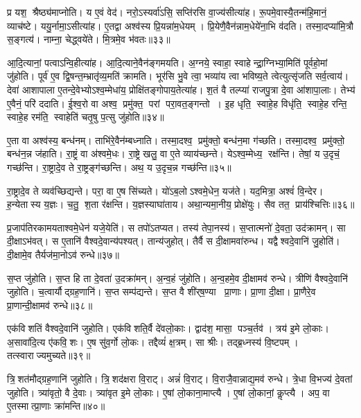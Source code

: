 प्र यश॒ श्रैष्ठ्य॑माप्नोति।
य ए॒वं वेद॑।
नरो॒ऽस्यर्वा॑ऽसि॒ सप्ति॑रसि वा॒ज्य॑सीत्या॑ह।
रू॒पमे॒वास्यै॒तन्म॑हि॒मानं॒ व्याच॑ष्टे।
ययु॒र्नामा॒ऽसीत्या॑ह।
ए॒तद्वा अश्व॑स्य प्रि॒यन्ना॑म॒धेयम्।
प्रि॒येणै॒वैन॑न्नाम॒धेये॑ना॒भि व॑दति।
तस्मा॒दप्या॑मि॒त्रौ स॒ङ्गत्य॑।
नाम्ना॒ चेद्ध्वये॑ते।
मि॒त्रमे॒व भ॑वतः॥३३॥

आ॒दि॒त्यानां॒ पत्वाऽन्वि॒हीत्या॑ह।
आ॒दि॒त्याने॒वैन॑ङ्गमयति।
अ॒ग्नये॒ स्वाहा॒ स्वाहेन्द्रा॒ग्निभ्या॒मिति॑ पूर्वहो॒मां जु॑होति।
पूर्व॑ ए॒व द्वि॒षन्त॒म्भ्रातृ॑व्य॒मति॑ क्रामति।
भूर॑सि भु॒वे त्वा॒ भव्या॑य त्वा भविष्य॒ते त्वेत्युत्सृ॑जति सर्व॒त्वाय॑।
देवा॑ आशापाला ए॒तन्दे॒वेभ्योऽश्व॒म्मेधा॑य॒ प्रोक्षि॑तङ्गोपाय॒तेत्या॑ह।
श॒तं वै तल्प्या॑ राजपु॒त्रा दे॒वा आ॑शापा॒लाः।
तेभ्य॑ ए॒वैनं॒ परि॑ ददाति।
ई॒श्व॒रो वा अश्व॒ प्रमु॑क्त॒ परां परा॒वत॒ङ्गन्तो।
इ॒ह धृति॒ स्वाहे॒ह विधृ॑ति॒ स्वाहे॒ह रन्ति॒ स्वाहे॒ह रम॑ति॒ स्वाहेति॑ चतृ॒षु प॒त्सु जु॑होति॥३४॥

ए॒ता वा अश्व॑स्य॒ बन्ध॑नम्।
ताभि॑रे॒वैन॑म्बध्नाति।
तस्मा॒दश्व॒ प्रमु॑क्तो॒ बन्ध॑न॒मा ग॑च्छति।
तस्मा॒दश्व॒ प्रमु॑क्तो॒ बन्ध॑न॒न्न ज॑हाति।
रा॒ष्ट्रं वा अ॑श्वमे॒धः।
रा॒ष्ट्रे खलु॒ वा ए॒ते व्याय॑च्छन्ते।
येऽश्व॒म्मेध्य॒ रक्ष॑न्ति।
तेषां॒ य उ॒दृचं॒ गच्छ॑न्ति।
रा॒ष्ट्रादे॒व ते रा॒ष्ट्रङ्ग॑च्छन्ति।
अथ॒ य उ॒दृच॒न्न गच्छ॑न्ति॥३५॥

रा॒ष्ट्रादे॒व ते व्यव॑च्छिद्यन्ते।
परा॒ वा ए॒ष सि॑च्यते।
यो॑ऽब॒लोऽश्वमे॒धेन॒ यज॑ते।
यद॒मित्रा॒ अश्वं॑ वि॒न्देर\sn{}।
ह॒न्येतास्य य॒ज्ञः।
च॒तु॒ श॒ता र॑क्षन्ति।
य॒ज्ञस्याघा॑ताय।
अथा॒न्यमा॒नीय॒ प्रोक्षे॑युः।
सैव तत॒ प्राय॑श्चित्तिः॥३६॥\anuvakamend[ग॒च्छ॒ति॒ भ॒व॒त॒ प॒त्सु जु॑होति॒ न गच्छ॑न्ति॒ नव॑ च]

प्र॒जाप॑तिरकामयताश्वमे॒धेन॑ यजे॒येति॑।
स तपो॑ऽतप्यत।
तस्य॑ तेपा॒नस्य॑।
स॒प्तात्मनो॑ दे॒वता॒ उद॑क्रामन्।
सा दी॒क्षाऽभ॑वत्।
स ए॒तानि॑ वैश्वदे॒वान्य॑पश्यत्।
तान्य॑जुहोत्।
तैर्वै स दी॒क्षामवा॑रुन्ध।
यद्वैश्वदे॒वानि॑ जु॒होति॑।
दी॒क्षामे॒व तैर्यज॑मा॒नोऽव॑ रुन्धे॥३७॥

स॒प्त जु॑होति।
स॒प्त हि ता दे॒वता॑ उ॒दक्रा॑मन्।
अ॒न्व॒हं जु॑होति।
अ॒न्व॒हमे॒व दी॒क्षामव॑ रुन्धे।
त्रीणि॑ वैश्वदे॒वानि॑ जुहोति।
च॒त्वार्यौद्ग्रह॒णानि॑।
स॒प्त सम्प॑द्यन्ते।
स॒प्त वै शी॑र्‌ष॒ण्या प्रा॒णाः।
प्रा॒णा दी॒क्षा।
प्रा॒णैरे॒व प्रा॒णान्दी॒क्षामव॑ रुन्धे॥३८॥

एक॑विशतिं वैश्वदे॒वानि॑ जुहोति।
एक॑विशति॒र्वै दे॑वलो॒काः।
द्वाद॑श॒ मासा॒ पञ्च॒र्तव॑।
त्रय॑ इ॒मे लो॒काः।
अ॒सावा॑दि॒त्य ए॑कवि॒शः।
ए॒ष सु॑व॒र्गो लो॒कः।
तद्दैव्यं॑ क्ष॒त्रम्।
सा श्रीः।
तद्ब्र॒ध्नस्य॑ वि॒ष्टपम्।
तत्स्वाराज्यमुच्यते॥३९॥

त्रि॒शत॑मौद्ग्रह॒णानि॑ जुहोति।
त्रि॒शद॑क्षरा वि॒राट्।
अन्नं॑ वि॒राट्।
वि॒राजै॒वान्नाद्य॒मव॑ रुन्धे।
त्रे॒धा वि॒भज्य॑ दे॒वतां जुहोति।
त्र्या॑वृतो॒ वै दे॒वाः।
त्र्या॑वृत इ॒मे लो॒काः।
ए॒षां लो॒काना॒माप्त्यै।
ए॒षां लो॒कानां॒ कॢप्त्यै।
अप॒ वा ए॒तस्मात्प्रा॒णाः क्रा॑मन्ति॥४०॥

